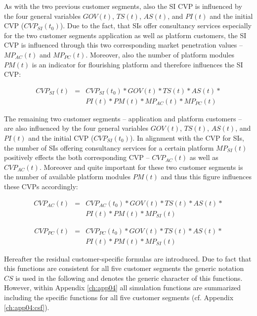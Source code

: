 As with the two previous customer segments, also the \ac{SI} \ac{CVP} is influenced by the four general variables $GOV(t)$, $TS(t)$, $AS(t)$, and $PI(t)$ and the initial \ac{CVP} ($CVP_{SI}(t_0)$). Due to the fact, that \acp{SI} offer consultancy services especially for the two customer segments application as well as platform customers, the \ac{SI} \ac{CVP} is influenced through this two corresponding market penetration values -- $MP_{AC}(t)$ and $MP_{PC}(t)$. Moreover, also the number of platform modules $PM(t)$ is an indicator for flourishing platform and therefore influences the \ac{SI} \ac{CVP}:

\begin{eqnarray}\label{eq:cvp:si}
		CVP_{SI}(t) & = & CVP_{SI}(t_0) * GOV(t) * TS(t) * AS(t) * \nonumber \\ & & PI(t) * PM(t) * MP_{AC}(t) * MP_{PC}(t)
\end{eqnarray}

The remaining two customer segments -- application and platform customers -- are also influenced by the four general variables $GOV(t)$, $TS(t)$, $AS(t)$, and $PI(t)$ and the initial \ac{CVP} ($CVP_{SI}(t_0)$). In alignment with the \ac{CVP} for \acp{SI}, the number of \acp{SI} offering consultancy services for a certain platform $MP_{SI}(t)$ positively effects the both corresponding \ac{CVP} -- $CVP_{AC}(t)$ as well as $CVP_{AC}(t)$. Moreover and quite important for these two customer segments is the number of available platform modules $PM(t)$ and thus this figure influences these \acp{CVP} accordingly:

\begin{eqnarray}\label{eq:cvp:ac}
		CVP_{AC}(t) & = & CVP_{AC}(t_0) * GOV(t) * TS(t) * AS(t) * \nonumber \\ & & PI(t) * PM(t) * MP_{SI}(t)
\end{eqnarray}

\begin{eqnarray}\label{eq:cvp:pc}
		CVP_ {PC}(t) & = & CVP_{PC}(t_0) * GOV(t) * TS(t) * AS(t) * \nonumber \\ & & PI(t) * PM(t) * MP_{SI}(t)
\end{eqnarray}

Hereafter the residual customer-specific formulas are introduced. Due to fact that this functions are consistent for all five customer segments the generic notation $CS$ is used in the following and denotes the generic character of this functions. However, within Appendix \ref{ch:app04} all simulation functions are summarized including the specific functions for all five customer segments (cf. Appendix \ref{ch:app04:csf}).


